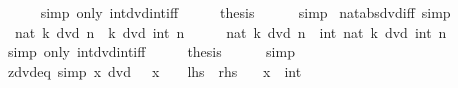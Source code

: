 \begin{isabellebody}
\ \ \ \ \isamarkupfalse%
\ {\isacharparenleft}{\kern0pt}simp\ only{\isacharcolon}{\kern0pt}\ int{\isacharunderscore}{\kern0pt}dvd{\isacharunderscore}{\kern0pt}int{\isacharunderscore}{\kern0pt}iff{\isacharparenright}{\kern0pt}\isanewline
\ \ \isamarkupfalse%
\ \isamarkupfalse%
\ {\isacharquery}{\kern0pt}thesis\isanewline
\ \ \ \ \isamarkupfalse%
\ simp\isanewline
{}\isamarkupfalse%
%
\endisatagproof
{\isafoldproof}%
%
\isadelimproof
\isanewline
%
\endisadelimproof
\isanewline
{}\isamarkupfalse%
\ nat{\isacharunderscore}{\kern0pt}abs{\isacharunderscore}{\kern0pt}dvd{\isacharunderscore}{\kern0pt}iff\ {\isacharbrackleft}{\kern0pt}simp{\isacharbrackright}{\kern0pt}{\isacharcolon}{\kern0pt}\isanewline
\ \ {\isachardoublequoteopen}nat\ {\isasymbar}k{\isasymbar}\ dvd\ n\ {\isasymlongleftrightarrow}\ k\ dvd\ int\ n{\isachardoublequoteclose}\isanewline
%
\isadelimproof
%
\endisadelimproof
%
\isatagproof
{}\isamarkupfalse%
\ {\isacharminus}{\kern0pt}\isanewline
\ \ \isamarkupfalse%
\ {\isachardoublequoteopen}nat\ {\isasymbar}k{\isasymbar}\ dvd\ n\ {\isasymlongleftrightarrow}\ int\ {\isacharparenleft}{\kern0pt}nat\ {\isasymbar}k{\isasymbar}{\isacharparenright}{\kern0pt}\ dvd\ int\ n{\isachardoublequoteclose}\isanewline
\ \ \ \ \isamarkupfalse%
\ {\isacharparenleft}{\kern0pt}simp\ only{\isacharcolon}{\kern0pt}\ int{\isacharunderscore}{\kern0pt}dvd{\isacharunderscore}{\kern0pt}int{\isacharunderscore}{\kern0pt}iff{\isacharparenright}{\kern0pt}\isanewline
\ \ \isamarkupfalse%
\ \isamarkupfalse%
\ {\isacharquery}{\kern0pt}thesis\isanewline
\ \ \ \ \isamarkupfalse%
\ simp\isanewline
{}\isamarkupfalse%
%
\endisatagproof
{\isafoldproof}%
%
\isadelimproof
\isanewline
%
\endisadelimproof
\isanewline
{}\isamarkupfalse%
\ zdvd{}{\isacharunderscore}{\kern0pt}eq\ {\isacharbrackleft}{\kern0pt}simp{\isacharbrackright}{\kern0pt}{\isacharcolon}{\kern0pt}\ {\isachardoublequoteopen}x\ dvd\ {}\ {\isasymlongleftrightarrow}\ {\isasymbar}x{\isasymbar}\ {\isacharequal}{\kern0pt}\ {}{\isachardoublequoteclose}\ {\isacharparenleft}{\kern0pt}\ {\isachardoublequoteopen}{\isacharquery}{\kern0pt}lhs\ {\isasymlongleftrightarrow}\ {\isacharquery}{\kern0pt}rhs{\isachardoublequoteclose}{\isacharparenright}{\kern0pt}\isanewline
\ \ \ x\ {\isacharcolon}{\kern0pt}{\isacharcolon}{\kern0pt}\ int\isanewline
%
\isadelimproof

\end{isabellebody}
